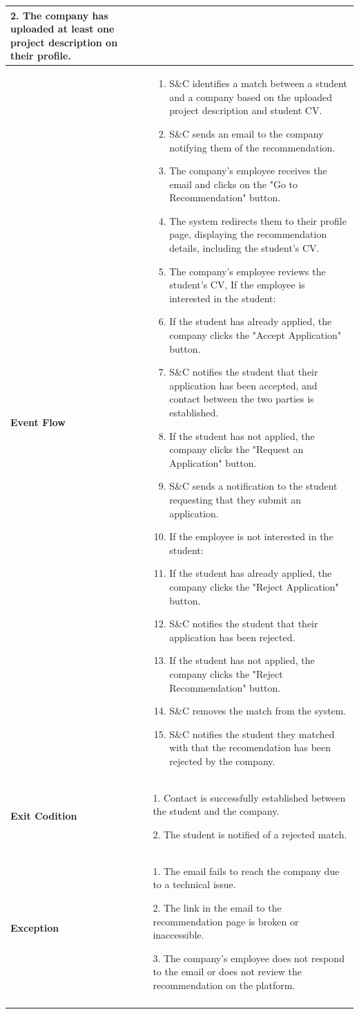 \begin{longtable}{|p{}|p{}|}
2. The company has uploaded at least one project description on their profile.\\
\hline
\textbf{Event Flow} &  
\begin{enumerate}
\item S\&C identifies a match between a student and a company based on the uploaded project description and student CV.	
\item S\&C sends an email to the company notifying them of the recommendation.
\item  The company’s employee receives the email and clicks on the "Go to Recommendation" button.
\item  The system redirects them to their profile page, displaying the recommendation details, including the student’s CV.
\item The company’s employee reviews the student’s CV, If the employee is interested in the student:
\item  If the student has already applied, the company clicks the "Accept Application" button.
\item S\&C notifies the student that their application has been accepted, and contact between the two parties is established.
\item  If the student has not applied, the company clicks the "Request an Application" button.
\item S\&C sends a notification to the student requesting that they submit an application.
\item If the employee is not interested in the student:
\item If the student has already applied, the company clicks the "Reject Application" button.
\item S\&C notifies the student that their application has been rejected.
\item  If the student has not applied, the company clicks the "Reject Recommendation" button.
\item S\&C removes the match from the system.
\item S\&C notifies the student they matched with that the recomendation has been rejected by the company. 
\end{enumerate}\\
\hline
\textbf{Exit Codition} &  
1. Contact is successfully established between the student and the company.

2. The student is notified of a rejected match.\\
\hline
\textbf{Exception} &  
1. The email fails to reach the company due to a technical issue.

2. The link in the email to the recommendation page is broken or inaccessible.	

3. The company’s employee does not respond to the email or does not review the recommendation on the platform.	\\
\\
\hline
\end{longtable}



